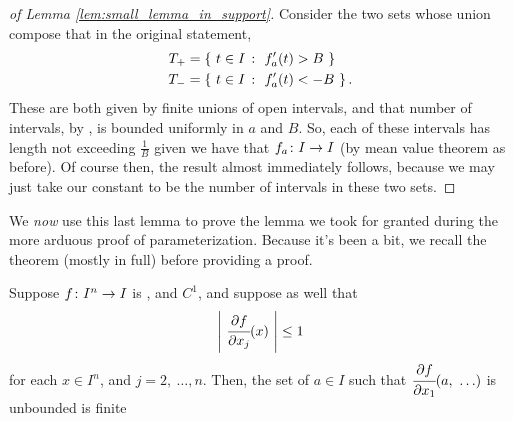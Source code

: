   \begin{proof}[of Lemma \ref{lem:small_lemma_in_support}]
    Consider the two sets whose union compose that in the original statement,
      \begin{align*}
        T_{+} &= \left\{ \ t \in I \ \colon \ \pri{f_a}(t) > B \ \right\} \\
        T_{-} &= \left\{ \ t \in I \ \colon \ \pri{f_a}(t) < -B \ \right\}.
      \end{align*}
    These are both given by finite unions of open intervals, and that number of intervals, by \om, is bounded uniformly in $a$ and $B$. So, each of these intervals has length not exceeding $\frac{1}{B}$ given we have that $f_a \colon I \to I$ (by mean value theorem as before). Of course then, the result almost immediately follows, because we may just take our constant to be the number of intervals in these two sets.
  \end{proof}

We \emph{now} use this last lemma to prove the lemma we took for granted during the more arduous proof of parameterization. Because it's been a bit, we recall the theorem (mostly in full) before providing a proof.

  \begin{lemma}
    Suppose $f \colon I^n \to I$ is , and $C^1$, and suppose as well that
    \begin{align*}
      \left\vert \  \cfrac{\partial f}{\partial x_j}(x)  \ \right\vert \leq 1
    \end{align*}
    for each $x \in I^n$, and $j = 2, \ \hdots, n$. Then, the set of $a \in I$ such that $\cfrac{\partial f}{\partial x_1}(a, \ \hdots)$ is unbounded is finite
  \end{lemma}

